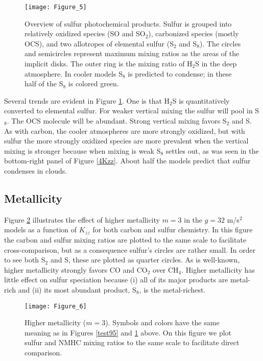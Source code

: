 \documentclass[preprint]{aastex6}
\begin{document}
 \begin{figure}[!htb] 
   \centering
   \texttt{[image: Figure\_5]} 
   \caption{\small Overview of sulfur photochemical products. 
   Sulfur is grouped into relatively oxidized species (SO and SO$_2$), 
   carbonized species (mostly OCS), and two allotropes of elemental sulfur (S$_2$ and S$_8$).
   The circles and semicircles represent maximum mixing ratios as the areas of the implicit disks. 
   The outer ring is the mixing ratio of H$_2$S in the deep atmosphere.
   In cooler models S$_8$ is predicted to condense; in these half of the S$_8$ is colored green.
 }
\label{test85}
\end{figure}

   Several trends are evident in Figure \ref{test85}. 
   One is that H$_2$S is quantitatively converted to elemental sulfur.
  For weaker vertical mixing the sulfur will pool in S$_8$. 
   The OCS molecule will be abundant.
  Strong vertical mixing favors S$_2$ and S.
   As with carbon, the cooler atmospheres are more strongly oxidized, but with sulfur
   the more strongly oxidized species are more prevalent when the vertical mixing is stronger
   because when mixing is weak S$_8$ settles out, as was seen in the bottom-right panel of Figure \ref{4Kzz}.
   About half the models predict that sulfur condenses in clouds. 


\subsection{Metallicity}

Figure \ref{test93} illustrates the effect of higher metallicity $m=3$ in the $g=32$ m/s$^2$ models
as a function of $K_{zz}$ for both carbon and sulfur chemistry.
In this figure the carbon and sulfur mixing ratios are plotted to the same scale to facilitate cross-comparison,
but as a consequence sulfur's circles are rather small.
In order to see both S$_2$ and S, these are plotted as quarter circles.
   As is well-known, higher metallicity strongly favors CO and CO$_2$ over CH$_4$.  
   Higher metallicity has little effect on sulfur speciation because
   (i) all of its major products are metal-rich and (ii) its most abundant product, S$_8$, is the metal-richest.
   
 \begin{figure}[!htb] 
   \centering
   \texttt{[image: Figure\_6]} 
   \caption{\small Higher metallicity ($m=3$). 
   Symbols and colors have the same meaning as in Figures \ref{test95} and \ref{test85} above.
   On this figure we plot sulfur and NMHC mixing ratios to the same scale to facilitate direct comparison.
}
\label{test93}
\end{figure}
\end{document}
